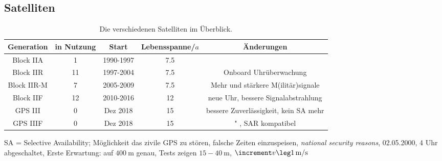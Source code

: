 \subsection{Satelliten}
\begin{table}
    \caption{Die verschiedenen Satelliten im Überblick.}
    \label{tab:satelliten}
    \begin{tabular}{c S[table-format=2.0] c S[table-format=2.1] c}
        \toprule
        {Generation} & {in Nutzung} & {Start} & {Lebensspanne\;/\;$a$} & {Änderungen} \\
        \midrule
        Block IIA   &  1 & 1990-1997 & 7.5 & \\
        Block IIR   & 11 & 1997-2004 & 7.5 & Onboard Uhrüberwachung \\
        Block IIR-M &  7 & 2005-2009 & 7.5 & Mehr und stärkere M(ilitär)signale \\
        Block IIF   & 12 & 2010-2016 & 12  & neue Uhr, bessere Signalabstrahlung \\
        GPS III     &  0 & Dez 2018  & 15  & bessere Zuverlässigkeit, kein SA mehr \\
        GPS IIIF    &  0 & Dez 2018  & 15  & " , SAR kompatibel \\
        \bottomrule
    \end{tabular}
\end{table}
SA = Selective Availability; Möglichkeit das zivile GPS zu stören, falsche Zeiten einzuspeisen, \textit{national security reasons}, 02.05.2000, 4 Uhr abgeschaltet,
Erste Erwartung: auf $\SI{400}{\meter}$ genau, Tests zeigen $15 - \SI{40}{\meter}$, $\increment v\leg \SI{1}{\meter\per\second}$
